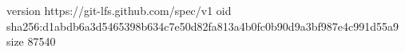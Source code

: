 version https://git-lfs.github.com/spec/v1
oid sha256:d1abdb6a3d5465398b634c7e50d82fa813a4b0fc0b90d9a3bf987e4c991d55a9
size 87540
